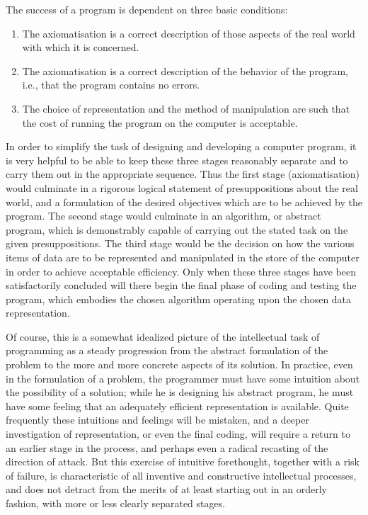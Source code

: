 The success of a program is dependent on three basic conditions:

\begin{enumerate}[wide, nosep, label=(\arabic*)]
	\item The axiomatisation is a correct description of those aspects of the real world with which it is concerned.
	\item The axiomatisation is a correct description of the behavior of the program, i.e., that the program contains no errors.
	\item The choice of representation and the method of manipulation are such that the cost of running the program on the computer is acceptable.
\end{enumerate}

In order to simplify the task of designing and developing a computer program, it is very helpful to be able to keep these three stages reasonably separate and to carry them out in the appropriate sequence. Thus the first stage (axiomatisation) would culminate in a rigorous logical statement of presuppositions about the real world, and a formulation of the desired objectives which are to be achieved by the program. The second stage would culminate in an algorithm, or abstract program, which is demonstrably capable of carrying out the stated task on the given presuppositions. The third stage would be the decision on how the various items of data are to be represented and manipulated in the store of the computer in order to achieve acceptable efficiency. Only when these three stages have been satisfactorily concluded will there begin the final phase of coding and testing the program, which embodies the chosen algorithm operating upon the chosen data representation.

Of course, this is a somewhat idealized picture of the intellectual task of programming as a steady progression from the abstract formulation of the problem to the more and more concrete aspects of its solution. In practice, even in the formulation of a problem, the programmer must have some intuition about the possibility of a solution; while he is designing his abstract program, he must have some feeling that an adequately efficient representation is available. Quite frequently these intuitions and feelings will be mistaken,
and a deeper investigation of representation, or even the final coding, will require a return to an earlier stage in the process, and perhaps even a radical recasting of the direction of attack. But this exercise of intuitive forethought, together with a risk of failure, is characteristic of all inventive and constructive intellectual processes, and does not detract from the merits of at least starting out in an orderly fashion, with more or less clearly separated stages.

